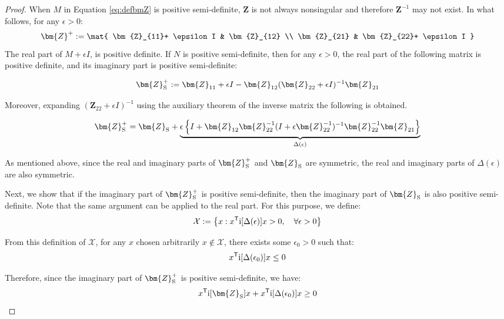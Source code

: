 \documentclass[graybox, envcountchap]{svmult}
\begin{document}
\begin{proof}
When $M$ in Equation \ref{eq:defbmZ} is positive semi-definite, $\bm{Z}$ is not
always nonsingular and therefore $\bm{Z}^{-1}$ may not exist. In what follows,
for any $\epsilon > 0$:
\begin{equation*}
  \bm{Z}^{+}
  :=
  \mat{
  \bm{Z}_{11}+ \epsilon I & \bm{Z}_{12} \\
  \bm{Z}_{21} & \bm{Z}_{22}+ \epsilon I
}
\end{equation*}
The real part of $M+\epsilon I$, is positive definite. If $N$ is positive
semi-definite, then for any $\epsilon >0$, the real part of the following matrix
is positive definite, and its imaginary part is positive semi-definite:

\begin{equation*}
  \bm{Z}_{\rm S}^{+}:=\bm{Z}_{11} + \epsilon I - \bm{Z}_{12} (\bm{Z}_{22}+ \epsilon I)^{-1}\bm{Z}_{21}
\end{equation*}

Moreover, expanding $(\bm{Z}_{22}+ \epsilon I)^{-1}$ using the auxiliary theorem
of the inverse matrix the following is obtained.

\begin{equation*}
  \bm{Z}_{\rm S}^{+}=
  \bm{Z}_{\rm S}
  + \underbrace{
  \epsilon
  \left\{
  I + \bm{Z}_{12} \bm{Z}_{22}^{-1}
  (I +\epsilon \bm{Z}_{22}^{-1} )^{-1}
  \bm{Z}_{22}^{-1}\bm{Z}_{21}
  \right\}
  }_{\Delta(\epsilon)}
\end{equation*}

As mentioned above, since the real and imaginary parts of $\bm{Z}_{\rm S}^{+}$
and $\bm{Z}_{\rm S}$ are symmetric, the real and imaginary parts of
$\Delta(\epsilon)$ are also symmetric.

Next, we show that if the imaginary part of $\bm{Z}_{\rm S}^{+}$ is positive
semi-definite, then the imaginary part of $\bm{Z}_{\rm S}$ is also positive
semi-definite. Note that the same argument can be applied to the real part. For
this purpose, we define:
\begin{equation*}
  \mathcal{X} := \left\{
  x: 
  x^{\sf T} {\rm i}[\Delta (\epsilon)] x >0
  ,\quad 
  \forall \epsilon >0
  \right\}
\end{equation*}

From this definition of $\mathcal{X}$, for any $x$ chosen arbitrarily $x \notin
\mathcal{X}$, there exists some $\epsilon_0 >0$ such that:
\[
  x^{\sf T} {\rm i}[\Delta(\epsilon_0)]x \leq 0
\]

Therefore, since the imaginary part of $ \bm{Z}_{\rm S}^{+} $ is positive
semi-definite, we have:
\begin{equation*}
  x^{\sf T} \imag [\bm{Z}_{\rm S}] x + x^{\sf T} \imag[\Delta(\epsilon_0)]x \geq 0
\end{equation*}


\end{proof}
\end{document}
